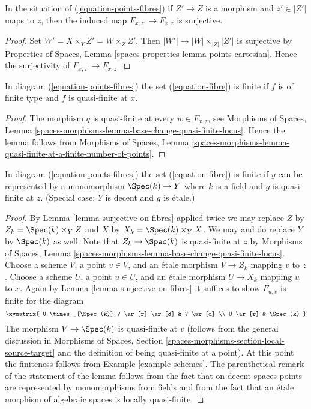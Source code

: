 \begin{lemma}
\label{lemma-surjective-on-fibres}
In the situation of (\ref{equation-points-fibres}) if $Z' \to Z$
is a morphism and $z' \in |Z'|$ maps to $z$, then the induced map
$F_{x, z'} \to F_{x, z}$ is surjective.
\end{lemma}

\begin{proof}
Set $W' = X \times_Y Z' = W \times_Z Z'$. Then
$|W'| \to |W| \times_{|Z|} |Z'|$ is surjective by
Properties of Spaces, Lemma \ref{spaces-properties-lemma-points-cartesian}.
Hence the surjectivity of $F_{x, z'} \to F_{x, z}$.
\end{proof}

\begin{lemma}
\label{lemma-qf-and-qc-finite-fibre}
In diagram (\ref{equation-points-fibres}) the set (\ref{equation-fibre})
is finite if $f$ is of finite type and $f$ is quasi-finite at $x$.
\end{lemma}

\begin{proof}
The morphism $q$ is quasi-finite at every $w \in F_{x, z}$, see
Morphisms of Spaces, Lemma
\ref{spaces-morphisms-lemma-base-change-quasi-finite-locus}.
Hence the lemma follows from
Morphisms of Spaces, Lemma
\ref{spaces-morphisms-lemma-quasi-finite-at-a-finite-number-of-points}.
\end{proof}

\begin{lemma}
\label{lemma-decent-finite-fibre}
In diagram (\ref{equation-points-fibres}) the set (\ref{equation-fibre})
is finite if $y$ can be represented by a monomorphism $\Spec(k) \to Y$
where $k$ is a field and $g$ is quasi-finite at $z$.
(Special case: $Y$ is decent and $g$ is \'etale.)
\end{lemma}

\begin{proof}
By Lemma \ref{lemma-surjective-on-fibres} applied twice
we may replace $Z$ by $Z_k = \Spec(k) \times_Y Z$ and
$X$ by $X_k = \Spec(k) \times_Y X$. We may and do
replace $Y$ by $\Spec(k)$ as well. Note that $Z_k \to \Spec(k)$
is quasi-finite at $z$ by Morphisms of Spaces, Lemma
\ref{spaces-morphisms-lemma-base-change-quasi-finite-locus}.
Choose a scheme $V$, a point $v \in V$, and an \'etale morphism
$V \to Z_k$ mapping $v$ to $z$. Choose a scheme $U$, a point $u \in U$,
and an \'etale morphism $U \to X_k$ mapping $u$ to $x$.
Again by Lemma \ref{lemma-surjective-on-fibres}
it suffices to show $F_{u, v}$ is finite for the diagram
$$
\xymatrix{
U \times_{\Spec(k)} V \ar[r] \ar[d] & V \ar[d] \\
U \ar[r] & \Spec(k)
}
$$
The morphism $V \to \Spec(k)$ is quasi-finite at $v$
(follows from the general discussion in
Morphisms of Spaces, Section \ref{spaces-morphisms-section-local-source-target}
and the definition of being quasi-finite at a point).
At this point the finiteness follows from Example \ref{example-schemes}.
The parenthetical remark of the statement of the lemma follows
from the fact that on decent spaces points are represented by
monomorphisms from fields and from the fact that an \'etale
morphism of algebraic spaces is locally quasi-finite.
\end{proof}

